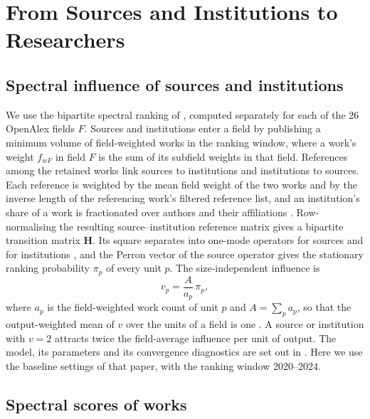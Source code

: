 \section{From Sources and Institutions to Researchers}
\label{sec:spectral_ranking}

\subsection{Spectral influence of sources and institutions}

We use the bipartite spectral ranking of \citet{docampodomingoRecirculatingCardinalSpectral2026}, computed separately for each of the 26 OpenAlex fields $F$. Sources and institutions enter a field by publishing a minimum volume of field-weighted works in the ranking window, where a work's weight $f_{wF}$ in field $F$ is the sum of its subfield weights in that field. References among the retained works link sources to institutions and institutions to sources. Each reference is weighted by the mean field weight of the two works and by the inverse length of the referencing work's filtered reference list, and an institution's share of a work is fractionated over authors and their affiliations \citep{waltmanFieldnormalizedCitationImpact2015}. Row-normalising the resulting source--institution reference matrix gives a bipartite transition matrix $\mathbf{H}$. Its square separates into one-mode operators for sources and for institutions \citep{breigerDualityPersonsGroups1974}, and the Perron vector of the source operator gives the stationary ranking probability $\pi_p$ of every unit $p$. The size-independent influence is
\begin{equation}
  v_p = \frac{A}{a_p}\,\pi_p ,
  \label{eq:v}
\end{equation}
where $a_p$ is the field-weighted work count of unit $p$ and $A = \sum_p a_p$, so that the output-weighted mean of $v$ over the units of a field is one \citep{pinskiCitationInfluenceJournal1976, palacios-huertaMeasurementIntellectualInfluence2004}. A source or institution with $v = 2$ attracts twice the field-average influence per unit of output. The model, its parameters and its convergence diagnostics are set out in \citet{docampodomingoRecirculatingCardinalSpectral2026}. Here we use the baseline settings of that paper, with the ranking window 2020--2024.

\subsection{Spectral scores of works}

